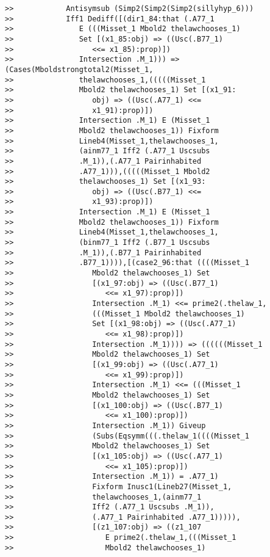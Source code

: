 \documentclass[12pt]{article}
\begin{document}
\begin{verbatim}
>>            Antisymsub (Simp2(Simp2(Simp2(sillyhyp_6)))
>>            Iff1 Dediff([(dir1_84:that (.A77_1
>>               E (((Misset_1 Mbold2 thelawchooses_1)
>>               Set [(x1_85:obj) => ((Usc(.B77_1)
>>                  <<= x1_85):prop)])
>>               Intersection .M_1))) => (Cases(Mboldstrongtotal2(Misset_1,
>>               thelawchooses_1,(((((Misset_1
>>               Mbold2 thelawchooses_1) Set [(x1_91:
>>                  obj) => ((Usc(.A77_1) <<=
>>                  x1_91):prop)])
>>               Intersection .M_1) E (Misset_1
>>               Mbold2 thelawchooses_1)) Fixform
>>               Lineb4(Misset_1,thelawchooses_1,
>>               (ainm77_1 Iff2 (.A77_1 Uscsubs
>>               .M_1)),(.A77_1 Pairinhabited
>>               .A77_1))),(((((Misset_1 Mbold2
>>               thelawchooses_1) Set [(x1_93:
>>                  obj) => ((Usc(.B77_1) <<=
>>                  x1_93):prop)])
>>               Intersection .M_1) E (Misset_1
>>               Mbold2 thelawchooses_1)) Fixform
>>               Lineb4(Misset_1,thelawchooses_1,
>>               (binm77_1 Iff2 (.B77_1 Uscsubs
>>               .M_1)),(.B77_1 Pairinhabited
>>               .B77_1)))),[(case2_96:that ((((Misset_1
>>                  Mbold2 thelawchooses_1) Set
>>                  [(x1_97:obj) => ((Usc(.B77_1)
>>                     <<= x1_97):prop)])
>>                  Intersection .M_1) <<= prime2(.thelaw_1,
>>                  (((Misset_1 Mbold2 thelawchooses_1)
>>                  Set [(x1_98:obj) => ((Usc(.A77_1)
>>                     <<= x1_98):prop)])
>>                  Intersection .M_1)))) => ((((((Misset_1
>>                  Mbold2 thelawchooses_1) Set
>>                  [(x1_99:obj) => ((Usc(.A77_1)
>>                     <<= x1_99):prop)])
>>                  Intersection .M_1) <<= (((Misset_1
>>                  Mbold2 thelawchooses_1) Set
>>                  [(x1_100:obj) => ((Usc(.B77_1)
>>                     <<= x1_100):prop)])
>>                  Intersection .M_1)) Giveup
>>                  (Subs(Eqsymm(((.thelaw_1((((Misset_1
>>                  Mbold2 thelawchooses_1) Set
>>                  [(x1_105:obj) => ((Usc(.A77_1)
>>                     <<= x1_105):prop)])
>>                  Intersection .M_1)) = .A77_1)
>>                  Fixform Inusc1(Lineb27(Misset_1,
>>                  thelawchooses_1,(ainm77_1
>>                  Iff2 (.A77_1 Uscsubs .M_1)),
>>                  (.A77_1 Pairinhabited .A77_1))))),
>>                  [(z1_107:obj) => ((z1_107
>>                     E prime2(.thelaw_1,(((Misset_1
>>                     Mbold2 thelawchooses_1)

\end{verbatim}
\end{document}
